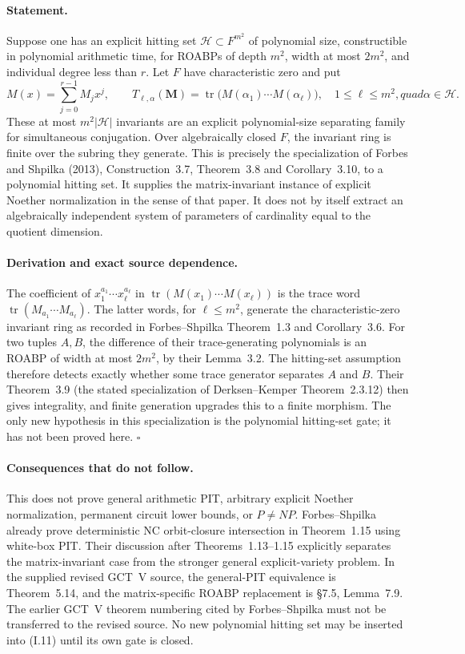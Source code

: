 \paragraph{Statement.}
Suppose one has an explicit hitting set $\mathcal H\subset F^{m^2}$
of polynomial size, constructible in polynomial arithmetic time,
for ROABPs of depth $m^2$, width at most $2m^2$, and individual
degree less than $r$.  Let $F$ have characteristic zero and put
\[
 M(x)=\sum_{j=0}^{r-1}M_jx^j,\qquad
 T_{\ell,\alpha}(\mathbf M)=
 \operatorname{tr}\bigl(M(\alpha_1)\cdots M(\alpha_\ell)\bigr),
 \quad1\le\ell\le m^2,quad\alpha\in\mathcal H.
\tag{I.11}
\]
These at most $m^2|\mathcal H|$ invariants are an explicit
polynomial-size separating family for simultaneous conjugation.
Over algebraically closed $F$, the invariant ring is finite over
the subring they generate.  This is precisely the specialization
of Forbes and Shpilka (2013), Construction~3.7, Theorem~3.8 and
Corollary~3.10, to a polynomial hitting set.  It supplies the
matrix-invariant instance of explicit Noether normalization in
the sense of that paper.  It does not by itself extract an
algebraically independent system of parameters of cardinality
equal to the quotient dimension.

\paragraph{Derivation and exact source dependence.}
The coefficient of $x_1^{a_1}\cdots x_\ell^{a_\ell}$ in
$\operatorname{tr}(M(x_1)\cdots M(x_\ell))$ is the trace word
$\operatorname{tr}(M_{a_1}\cdots M_{a_\ell})$.  The latter words,
for $\ell\le m^2$, generate the characteristic-zero invariant ring
as recorded in Forbes--Shpilka Theorem~1.3 and Corollary~3.6.
For two tuples $A,B$, the difference of their trace-generating
polynomials is an ROABP of width at most $2m^2$, by their Lemma~3.2.
The hitting-set assumption therefore detects exactly whether
some trace generator separates $A$ and $B$.  Their Theorem~3.9
(the stated specialization of Derksen--Kemper Theorem~2.3.12)
then gives integrality, and finite generation upgrades this to
a finite morphism.  The only new hypothesis in this specialization
is the polynomial hitting-set gate; it has not been proved here.
\hfill$\square$

\paragraph{Consequences that do not follow.}
This does not prove general arithmetic PIT, arbitrary explicit
Noether normalization, permanent circuit lower bounds, or
$P\ne NP$.  Forbes--Shpilka already prove deterministic NC
orbit-closure intersection in Theorem~1.15 using white-box PIT.
Their discussion after Theorems~1.13--1.15 explicitly separates
the matrix-invariant case from the stronger general explicit-variety
problem.  In the supplied revised GCT~V source, the general-PIT
equivalence is Theorem~5.14, and the matrix-specific ROABP replacement
is \S7.5, Lemma~7.9.  The earlier GCT~V theorem numbering cited by
Forbes--Shpilka must not be transferred to the revised source.  No new polynomial hitting set
may be inserted into (I.11) until its own gate is closed.

